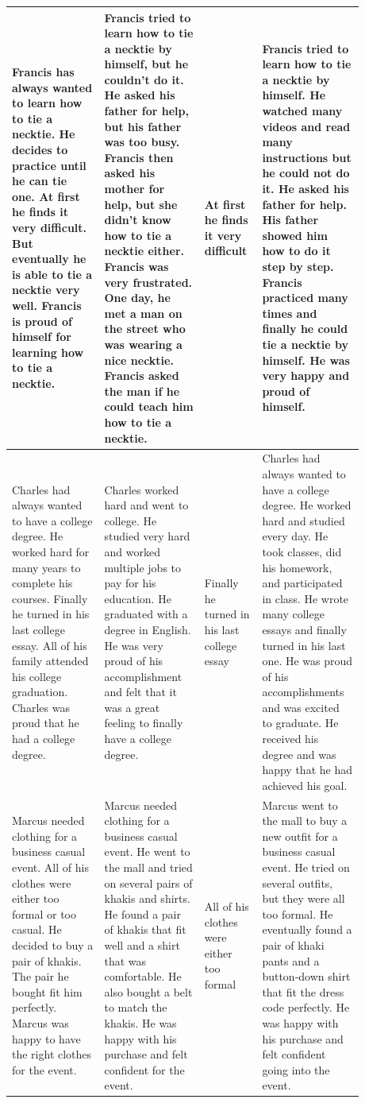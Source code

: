 \begin{table}[htp!]
\begin{tabular}{|p{0.24\linewidth}|p{0.26\linewidth}|p{0.12\linewidth}|p{0.26\linewidth}|}
Francis has always wanted to learn how to tie a necktie. He decides to practice until he can tie one. At first he finds it very difficult. But eventually he is able to tie a necktie very well. Francis is proud of himself for learning how to tie a necktie.
& Francis tried to learn how to tie a necktie by himself, but he couldn't do it. He asked his father for help, but his father was too busy. Francis then asked his mother for help, but she didn't know how to tie a necktie either. Francis was very frustrated. One day, he met a man on the street who was wearing a nice necktie. Francis asked the man if he could teach him how to tie a necktie.
& At first he finds it very difficult
& Francis tried to learn how to tie a necktie by himself. He watched many videos and read many instructions but he could not do it. He asked his father for help. His father showed him how to do it step by step. Francis practiced many times and finally he could tie a necktie by himself. He was very happy and proud of himself. \\ \hline

Charles had always wanted to have a college degree. He worked hard for many years to complete his courses. Finally he turned in his last college essay. All of his family attended his college graduation. Charles was proud that he had a college degree.
& Charles worked hard and went to college. He studied very hard and worked multiple jobs to pay for his education. He graduated with a degree in English. He was very proud of his accomplishment and felt that it was a great feeling to finally have a college degree.
& Finally he turned in his last college essay
& Charles had always wanted to have a college degree. He worked hard and studied every day. He took classes, did his homework, and participated in class. He wrote many college essays and finally turned in his last one. He was proud of his accomplishments and was excited to graduate. He received his degree and was happy that he had achieved his goal. \\ \hline

Marcus needed clothing for a business casual event. All of his clothes were either too formal or too casual. He decided to buy a pair of khakis. The pair he bought fit him perfectly. Marcus was happy to have the right clothes for the event.
& Marcus needed clothing for a business casual event. He went to the mall and tried on several pairs of khakis and shirts. He found a pair of khakis that fit well and a shirt that was comfortable. He also bought a belt to match the khakis. He was happy with his purchase and felt confident for the event.
& All of his clothes were either too formal
& Marcus went to the mall to buy a new outfit for a business casual event. He tried on several outfits, but they were all too formal. He eventually found a pair of khaki pants and a button-down shirt that fit the dress code perfectly. He was happy with his purchase and felt confident going into the event. \\ \hline


\end{tabular}
\end{table}
